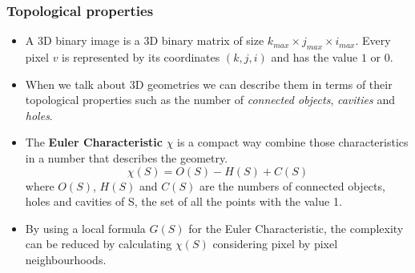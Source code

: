 \begin{frame}
  \frametitle{Topological properties}
  \begin{itemize}
    \item A 3D binary image is a 3D binary matrix of size $k_{max}\times j_{max} \times i_{max}$. Every pixel $v$ is represented by its coordinates $(k, j, i)$ and has the value $1$ or $0$.
    \item When we talk about 3D geometries we can describe them in terms of their topological properties such as the number of \emph{connected objects}, \emph{cavities} and \emph{holes}.
    \item The \textbf{Euler Characteristic} $\chi$ is a compact way combine those characteristics in a number that describes the geometry.
          \begin{equation}
            \chi(S) = O(S) - H(S) + C(S)
          \end{equation}
          where $O(S)$, $H(S)$ and $C(S)$ are the numbers of connected objects, holes and cavities of S, the set of all the points with the value 1.
    \item By using a local formula $G(S)$ for the Euler Characteristic, the complexity can be reduced by calculating $\chi(S)$ considering pixel by pixel neighbourhoods.
  \end{itemize}
\end{frame}

